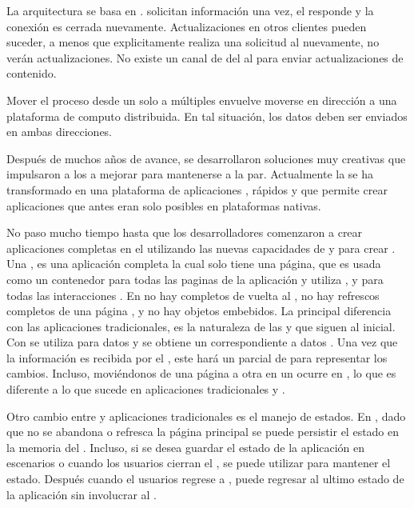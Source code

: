 La arquitectura \clientserver se basa en \statelessconnections. \clientsAS solicitan información una vez, el \serverAS responde y la conexión es cerrada nuevamente. Actualizaciones en otros clientes pueden suceder, a menos que explicitamente realiza una solicitud al \serverAS nuevamente, no verán actualizaciones. No existe un canal de \feedback del \serverAS al \clientAS para enviar actualizaciones de contenido.

Mover el proceso desde un solo \serverAS a múltiples \clientsAS envuelve moverse en dirección a una plataforma de computo distribuida. En tal situación, los datos deben ser enviados en ambas direcciones.

Después de muchos años de avance, se desarrollaron soluciones muy creativas que impulsaron a los \browsers a mejorar para mantenerse a la par. 
Actualmente la \web se ha transformado en una plataforma de aplicaciones \fullyfeatured, \runtimes \javaScriptNAME rápidos y \standard \htmlfive que permite crear aplicaciones que antes eran solo posibles en plataformas nativas.

No paso mucho tiempo hasta que los desarrolladores comenzaron a crear aplicaciones completas en el \browser utilizando las nuevas capacidades de \javaScriptNAME y \htmlfive para crear \singlePageApp. Una \spa, es una aplicación \web completa la cual solo tiene una página, que es usada como un contenedor para todas las paginas \web de la aplicación y utiliza \javaScriptNAME, \htmlfive y \cssNAME para todas las interacciones \frontEndsAS. En \spas no hay \posts completos de vuelta al \serverAS, no hay refrescos completos de una página \web, y no hay objetos embebidos. La principal diferencia con las aplicaciones \web tradicionales, es la naturaleza de las \requests y \responses que siguen al \requestINT \httpNAME inicial. Con \spa se utiliza \ajax para \requestINT datos y se obtiene un \response correspondiente a datos \json. Una vez que la información es recibida por el \clientAS, este hará un \render parcial de \htmlNAME para representar los cambios. Incluso, moviéndonos de una página a otra en un \spa ocurre en \clientSide, lo que es diferente a lo que sucede en aplicaciones tradicionales y \ria.

Otro cambio entre \spa y aplicaciones \web tradicionales es el manejo de estados. En \spa, dado que no se abandona o refresca la página \web principal se puede persistir el estado en la memoria del \browser. Incluso, si se desea guardar el estado de la aplicación en escenarios \offline o cuando los usuarios cierran el \browser, se puede utilizar \htmlfive \storage para mantener el estado. Después cuando el usuarios regrese a \online, puede regresar al ultimo estado de la aplicación sin involucrar al \serverAS.

